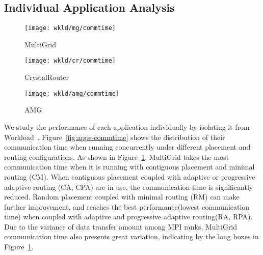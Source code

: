 \subsection{Individual Application Analysis}
\label{sec: workload-1 app analysis}

\begin{figure*}[t!]
    \centering
    \begin{subfigure}[t]{0.32\textwidth}
        \centering
        \texttt{[image: wkld/mg/commtime]}
        \caption{MultiGrid}
        \label{fig:mg-commtime}
    \end{subfigure}%
    \hspace{1em}%
    \begin{subfigure}[t]{0.32\textwidth}
        \centering
        \texttt{[image: wkld/cr/commtime]}
        \caption{CrystalRouter}
        \label{fig:cr-commtime}
    \end{subfigure}%
    \hspace{1em}%
    \begin{subfigure}[t]{0.32\textwidth}
        \centering
        \texttt{[image: wkld/amg/commtime]}
        \caption{AMG}
        \label{fig:amg-commtime}
    \end{subfigure}%
    \caption{The communication time of all ranks in each application. Random placement and adaptive routing can improve the communication time of MultiGrid and CrystalRouter, while AMG's communication time is greatly prolonged.}
   \label{fig:apps-commtime}
\end{figure*}



We study the performance of each application individually by isolating it from Workload~.   
Figure~\ref{fig:apps-commtime} shows the distribution of their communication time when running concurrently under different placement and routing configurations.
As shown in Figure~\ref{fig:mg-commtime}, 
MultiGrid takes the most communication time when it is running with contiguous placement and minimal routing (CM). 
When contiguous placement coupled with adaptive or progressive adaptive routing (CA, CPA) are in use, 
the communication time is significantly reduced. 
Random placement coupled with minimal routing (RM) can make further improvement, 
and reaches the best performance(lowest communication time) when coupled with adaptive and progressive adaptive routing(RA, RPA). 
Due to the variance of data transfer amount among MPI ranks, 
MultiGrid communication time also presents great variation, 
indicating by the long boxes in Figure~\ref{fig:mg-commtime}.

